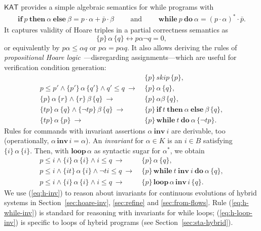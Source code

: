 \documentclass[envcountsame]{llncs}
\newcommand{\IF}[3]{\mathbf{if}\ #1\ \mathbf{then}\ #2\ \mathbf{else}\ #3}
\newcommand{\WHILE}[2]{\mathbf{while}\ #1\ \mathbf{do}\ #2}
\newcommand{\WHILEI}[3]{\mathbf{while}\ #1\ \mathbf{inv}\ #2\ \mathbf{do}\ #3}
\newcommand{\sskip}{\mathit{skip}}
\newcommand{\KAT}{\mathsf{KAT}}
\begin{document}
$\KAT$ provides a simple algebraic semantics for while
programs with
\begin{align*}
  \IF{p}{\alpha}{\beta} = p\cdot \alpha + \bar p \cdot
  \beta\qquad\text{ and }\qquad
\WHILE{p}{\alpha} = (p\cdot \alpha)^\ast \cdot \bar p.
\end{align*}
It captures validity of Hoare triples in
a partial correctness semantics as
\begin{equation*}
  \{p\}\, \alpha\, \{q\} \leftrightarrow p\alpha\neg q = 0,
\end{equation*}
or equivalently by $p\alpha\le \alpha q$ or $p\alpha = p\alpha q$. It
also allows deriving the rules of \emph{propositional Hoare
  logic}~\cite{Kozen00}---disregarding assignments---which are useful for
verification condition generation:
\begin{align}
  &\{p\}\, \sskip\, \{p\}, \label{eq:h-skip}\tag{h-skip}\\
  p\le p' \land \{p'\}\, \alpha\, \{q'\} \land q'\le q\ \rightarrow\ &
                                                                       \{p\}\,
                                                                       \alpha\,
                                                                       \{q\},\label{eq:h-cons}\tag{h-cons}\\
  \{p\}\, \alpha\, \{r\} \land \{r\}\, \beta\, \{q\}\ \rightarrow\
  &\{p\}\, \alpha\beta\, \{q\},\label{eq:h-seq}\tag{h-seq}\\
  \{tp\}\, \alpha\, \{q\}\land \{\neg tp\}\, \beta\, \{q\}\
  \rightarrow\ & \{p\}\, \IF{t}{\alpha}{\beta}\, \{q\},\label{eq:h-cond}\tag{h-cond}\\
  \{tp\}\, \alpha\, \{p\}\ \rightarrow\ & \{p\}\, \WHILE{t}{\alpha}\, \{\neg tp\}.\label{eq:h-while}\tag{h-while}
\end{align}
Rules for commands with invariant assertions $\alpha\ \mathbf{inv}\ i$
are derivable, too (operationally,
$\alpha\, \mathbf{inv}\, i = \alpha$).  An \emph{invariant} for
$\alpha\in K$ is an $i\in B$ satisfying $\{i\}\, \alpha\, \{i\}$.
Then, with $\mathbf{loop}\, \alpha$ as syntactic sugar for
$\alpha^\ast$, we obtain
\begin{align}
  p\le i \land \{i\}\, \alpha\, \{i\}\land i\le q\ \rightarrow\
  &\{p\}\, \alpha\, \{q\},\label{eq:h-inv}\tag{h-inv}\\
  p \le i \wedge \{it\}\, \alpha\, \{i\} \wedge \neg t i\le q\
  \rightarrow \ & \{p\}\, \WHILEI{t}{i}{\alpha}\,  \{q\},\label{eq:h-while-inv}\tag{h-while-inv}\\
   p\le i \land \{i\}\, \alpha\, \{i\}\land i\le q\ \rightarrow\ &
                                                                   \{p\}\, \mathbf{loop}\, \alpha\,
    \mathbf{inv}\, i\, \{q\}. \label{eq:h-loop-inv}\tag{h-loop-inv}
\end{align}
We use (\ref{eq:h-inv}) to reason about invariants for continuous
evolutions of hybrid systems in Section~\ref{sec:hoare-inv},
\ref{sec:refine} and \ref{sec:from-flows}. Rule (\ref{eq:h-while-inv})
is standard for reasoning with invariants for while loops;
(\ref{eq:h-loop-inv}) is specific to loops of hybrid programs (see
Section~\ref{sec:sta-hybrid}).
\end{document}
